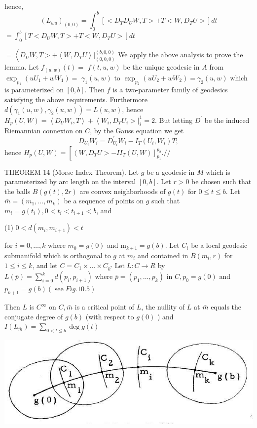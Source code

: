 \documentclass[10pt]{article}
\begin{document}
hence,
$$
\left(L_{w u}\right)_{(0,0)}=\int_{0}^{b}\left[<D_{T} D_{U} W, T>+T<W, D_{T} U>\right] d t
$$
$=\int_{0}^{b}\left[T<D_{U} W, T>+T<W, D_{T} U>\right] d t$

$=\left\langle D_{U} W, T>+\left.\left\langle W, D_{T} U\right\rangle\right|_{(0,0,0)} ^{(b, 0,0)}\right.$ We apply the above analysis to prove the lemma. Let $f_{(u, w)}(t)=$ $f(t, u, w)$ be the unique geodesic in $A$ from $\exp _{p_{1}}\left(u U_{1}+w W_{1}\right)=$ $\gamma_{1}(u, w)$ to $\exp _{p_{2}}\left(u U_{2}+w W_{2}\right)=\gamma_{2}(u, w)$ which is parameterized on $[0, b]$. Then $f$ is a two-parameter family of geodesics satisfying the above requirements. Furthermore $d\left(\gamma_{1}(u, w), \gamma_{2}(u, w)\right)=L(u, w)$, hence $H_{p}(U, W)=\left\langle D_{U} W_{i}, T\right\rangle+\left\langle W_{i}, D_{T} U_{i}>\left.\right|_{i} ^{1}=2\right.$. But letting $D^{\prime}$ be the induced Riemannian connexion on $C$, by the Gauss equation we get
$$
D_{U_{i}} W_{i}=D_{U_{i}}^{\prime} W_{i}-I_{T}\left(U_{i}, W_{i}\right) T ;
$$
hence $H_{p}(U, W)=\left[\left\langle W, D_{T} U>-I I_{T}(U, W)\right]_{p_{1}}^{p_{2}} . / /\right.$

THEOREM 14 (Morse Index Theorem). Let $g$ be a geodesic in $M$ which is parameterized by arc length on the interval $[0, b] .$ Let $r>0$ be chosen such that the balls $B(g(t), 2 r)$ are convex neighborhoods of $g(t)$ for $0 \leq t \leq b .$ Let $\bar{m}=\left(m_{1}, \ldots, m_{k}\right)$ be a sequence of points on $g$ such that $m_{i}=g\left(t_{i}\right), 0<t_{i}<t_{i+1}<b$, and

(1) $0<d\left(m_{i}, m_{i+1}\right)<t$

for $i=0, \ldots, k$ where $m_{0}=g(0)$ and $\mathrm{m}_{k+1}=g(b) .$ Let $C_{i}$ be a local geodesic submanifold which is orthogonal to $g$ at $m_{i}$ and contained in $B\left(m_{i}, r\right)$ for $1 \leq i \leq k$, and let $C=C_{1} \times \ldots \times C_{k^{*}} \operatorname{Let} L: C \rightarrow R$ by $L(\bar{p})=\sum_{i=0}^{k} d\left(p_{i}, p_{i+1}\right)$ where $\bar{p}=\left(p_{1}, \ldots, p_{k}\right)$ in $C, p_{0}=g(0)$ and $p_{k+1}=g(b)(\operatorname{see} F i g .10 .5)$

Then $L$ is $C^{\infty}$ on $C, \bar{m}$ is a critical point of $L$, the nullity of $L$ at $\bar{m}$ equals the conjugate degree of $g(b)$ (with respect to $g(0)$ ) and $I\left(L_{\bar{m}}\right)=\sum_{0<t \leq b} \operatorname{deg} g(t)$

\includegraphics[max width=\textwidth]{2022_07_16_f4e476ee2159dc67e746g-84}
\end{document}
